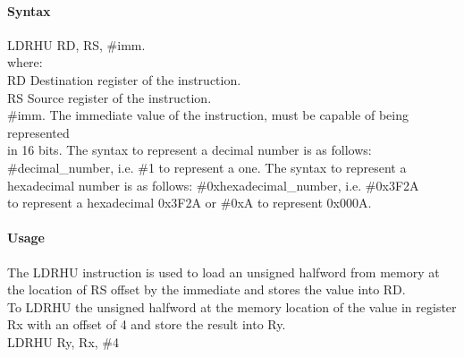 \documentclass[12pt]{article}
\begin{document}
    \paragraph{Syntax}
    \begin{flushleft}
    LDRHU RD, RS, \#imm.\\
    \vspace{1em}        %
    where:\\
    \vspace{1em}
    RD  \hspace{3.6em} Destination register of the instruction.\\
    \vspace{1em}
    RS  \hspace{3.85em} Source register of the instruction.\\
    \vspace{1em}
    \#imm.  \hspace{1.8em} The immediate value of the instruction, must be capable of being represented\\             \hspace{5.4em} in 16 bits. The syntax to represent a decimal number is as follows:\\
            \hspace{5.4em} \#decimal\_number, i.e. \#1 to represent a one. The syntax to represent a\\
            \hspace{5.4em} hexadecimal number is as follows: \#0xhexadecimal\_number, i.e. \#0x3F2A \\
            \hspace{5.4em} to represent a hexadecimal 0x3F2A or \#0xA to represent 0x000A.\\
    \end{flushleft}
    
    \paragraph{Usage}
    \begin{flushleft}
    The LDRHU instruction is used to load an unsigned halfword from memory at the location of RS offset by the immediate and stores the value into RD.\\    
    \vspace{1em}
    To LDRHU the unsigned halfword at the memory location of the value in register Rx with an offset of 4 and store the result into Ry.\\
    \vspace{1em}
    LDRHU Ry, Rx, \#4
    \end{flushleft}
    
\end{document}
